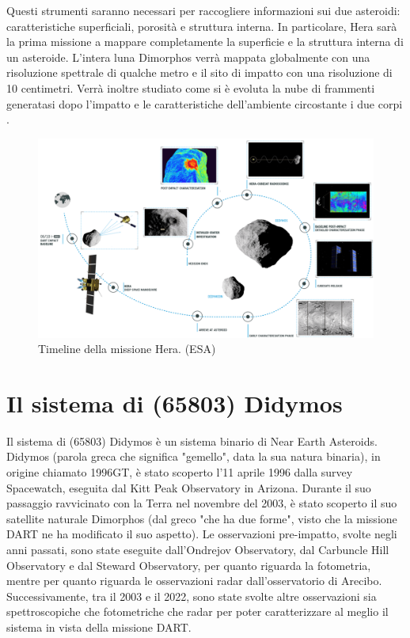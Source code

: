 \documentclass[a4paper,11pt,openright]{book}
\begin{document}
Questi strumenti saranno necessari per raccogliere informazioni sui due asteroidi: caratteristiche superficiali, porosità e struttura interna. In particolare, Hera sarà la prima missione a mappare completamente la superficie e la struttura interna di un asteroide. L'intera luna Dimorphos verrà mappata globalmente con una risoluzione spettrale di qualche metro e il sito di impatto con una risoluzione di 10 centimetri. Verrà inoltre studiato come si è evoluta la nube di frammenti generatasi dopo l'impatto e le caratteristiche dell'ambiente circostante i due corpi \citep{michel_esa_2022}.

\begin{figure}[!h]
    \centering
    \includegraphics[scale=0.50]{figure/Hera_mission_timeline.png}
    \caption[Timeline della missione Hera.]{Timeline della missione Hera. (ESA)}
    \label{fig:hera_timeline}
\end{figure}


\chapter{Il sistema di (65803) Didymos}\label{ch:ch_4}
Il sistema di (65803) Didymos è un sistema binario di Near Earth Asteroids.\\
Didymos (parola greca che significa "gemello", data la sua natura binaria), in origine chiamato 1996GT, è stato scoperto l'11 aprile 1996 dalla survey Spacewatch, eseguita dal Kitt Peak Observatory in Arizona. Durante il suo passaggio ravvicinato con la Terra nel novembre del 2003, è stato scoperto il suo satellite naturale Dimorphos (dal greco "che ha due forme", visto che la missione DART ne ha modificato il suo aspetto). Le osservazioni pre-impatto, svolte negli anni passati, sono state eseguite dall'Ondrejov Observatory, dal Carbuncle Hill Observatory e dal Steward Observatory, per quanto riguarda la fotometria, mentre per quanto riguarda le osservazioni radar dall'osservatorio di Arecibo.\\
Successivamente, tra il 2003 e il 2022, sono state svolte altre osservazioni sia spettroscopiche che fotometriche che radar per poter caratterizzare al meglio il sistema in vista della missione DART.
\end{document}
